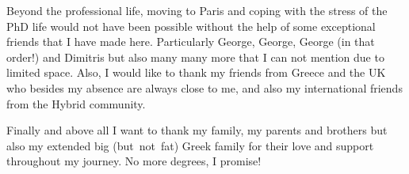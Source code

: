 Beyond the professional life, moving to Paris and coping with the stress of the PhD life would not have been possible without the help of some exceptional friends that I have made here. Particularly George, George, George (in that order!) and Dimitris but also many many more that I can not mention due to limited space. Also, I would like to thank my friends from Greece and the UK who besides my absence are always close to me, and also my international friends from the Hybrid community.

Finally and above all I want to thank my family, my parents and brothers but also my extended big \mbox{(but not fat)} Greek family for their love and support throughout my journey. No more degrees, I promise!


